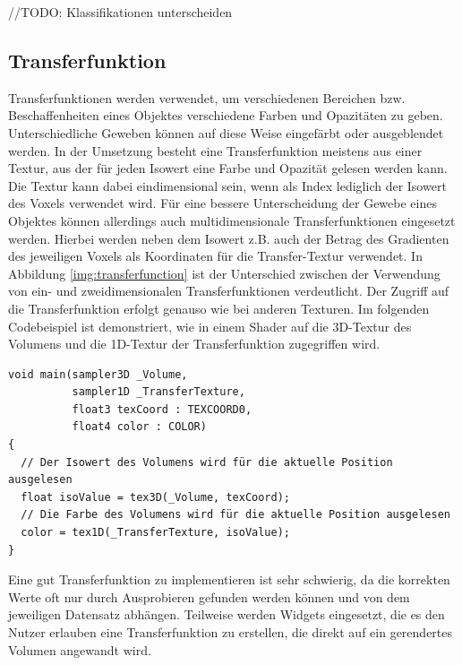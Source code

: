 //TODO:
Klassifikationen unterscheiden

\subsection{Transferfunktion}

Transferfunktionen werden verwendet, um verschiedenen Bereichen bzw. Beschaffenheiten eines Objektes verschiedene Farben und Opazitäten zu geben. Unterschiedliche Geweben können auf diese Weise eingefärbt oder ausgeblendet werden. In der Umsetzung besteht eine Transferfunktion meistens aus einer Textur, aus der für jeden Isowert eine Farbe und Opazität gelesen werden kann. Die Textur kann dabei eindimensional sein, wenn als Index lediglich der Isowert des Voxels verwendet wird. Für eine bessere Unterscheidung der Gewebe eines Objektes können allerdings auch multidimensionale Transferfunktionen eingesetzt werden. Hierbei werden neben dem Isowert z.B. auch der Betrag des Gradienten des jeweiligen Voxels als Koordinaten für die Transfer-Textur verwendet. In Abbildung \ref{img:transferfunction} ist der Unterschied zwischen der Verwendung von ein- und zweidimensionalen Transferfunktionen verdeutlicht. Der Zugriff auf die Transferfunktion erfolgt genauso wie bei anderen Texturen. Im folgenden Codebeispiel ist demonstriert, wie in einem Shader auf die 3D-Textur des Volumens und die 1D-Textur der Transferfunktion zugegriffen wird. \cite{Fernando04}

\begin{verbatim}
void main(sampler3D _Volume,
          sampler1D _TransferTexture,
          float3 texCoord : TEXCOORD0,
          float4 color : COLOR)
{
  // Der Isowert des Volumens wird für die aktuelle Position ausgelesen
  float isoValue = tex3D(_Volume, texCoord);
  // Die Farbe des Volumens wird für die aktuelle Position ausgelesen
  color = tex1D(_TransferTexture, isoValue);
}
\end{verbatim}

Eine gut Transferfunktion zu implementieren ist sehr schwierig, da die korrekten Werte oft nur durch Ausprobieren gefunden werden können und von dem jeweiligen Datensatz abhängen. Teilweise werden Widgets eingesetzt, die es den Nutzer erlauben eine Transferfunktion zu erstellen, die direkt auf ein gerendertes Volumen angewandt wird.

